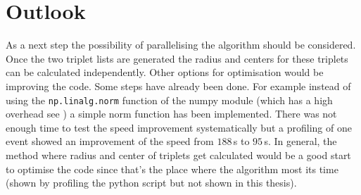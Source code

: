 \documentclass[11pt,twoside]{scrreprt}
\begin{document}
\section{Outlook} %
\label{sec:outlook}
As a next step the possibility of parallelising the algorithm should be considered. Once the two triplet lists are generated the radius and centers
for these triplets can be calculated independently.
Other options for optimisation would be improving the code. Some steps have already been done. For example instead of using the \texttt{np.linalg.norm} function of the numpy module (which has a high overhead see \cite{NumpyNorm}) a simple norm function has been implemented. There was not enough time to test the speed improvement systematically but a profiling of one event showed an improvement of the speed from $188$\,s to $95$\,s. In general, the method where
radius and center of triplets get calculated would be a good start to optimise the code since that's the place where the algorithm most its time (shown by profiling the python script but not shown in this thesis).

\printbibliography
\end{document}
